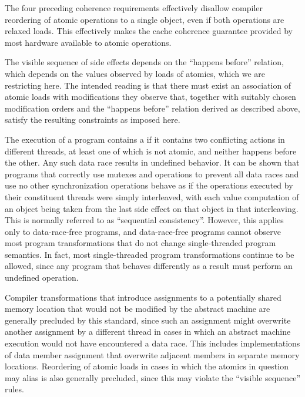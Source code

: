 \pnum
\enternote The four preceding coherence requirements effectively disallow
compiler reordering of atomic operations to a single object, even if both
operations are relaxed loads. This effectively makes the cache coherence
guarantee provided by most hardware available to \Cpp atomic operations.
\exitnote

\pnum
\enternote The visible sequence of
%
side effects depends on the ``happens
before'' relation, which depends on the values observed by loads of atomics,
which we are restricting here. The intended reading is that there must exist an
association of atomic loads with modifications they observe that, together with
suitably chosen modification orders and the ``happens before'' relation derived
as described above, satisfy the resulting constraints as imposed here. \exitnote

\pnum
The execution of a program contains a  if it contains two
conflicting actions in different threads, at least one of which is not atomic,
and neither happens before the other. Any such data race results in undefined
behavior. \enternote It can be shown that programs that correctly use mutexes
and  operations to prevent all data races and use no
other synchronization operations behave as if the operations executed by their
constituent threads were simply interleaved, with each
%
value computation of an
object being taken from the last
%
side effect on that object in that
interleaving. This is normally referred to as ``sequential consistency''.
However, this applies only to data-race-free programs, and data-race-free
programs cannot observe most program transformations that do not change
single-threaded program semantics. In fact, most single-threaded program
transformations continue to be allowed, since any program that behaves
differently as a result must perform an undefined operation. \exitnote

\pnum
\enternote Compiler transformations that introduce assignments to a potentially
shared memory location that would not be modified by the abstract machine are
generally precluded by this standard, since such an assignment might overwrite
another assignment by a different thread in cases in which an abstract machine
execution would not have encountered a data race. This includes implementations
of data member assignment that overwrite adjacent members in separate memory
locations. Reordering of atomic loads in cases in which the atomics in question
may alias is also generally precluded, since this may violate the ``visible
sequence'' rules. \exitnote

